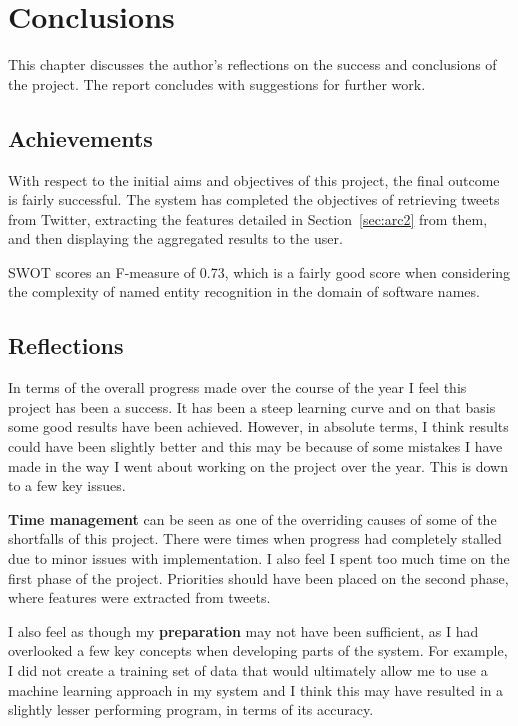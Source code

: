 \chapter{Conclusions}
\label{cha:conclusion}
This chapter discusses the author's reflections on the success and conclusions of the project. The report concludes with suggestions for further work.

\section{Achievements}
With respect to the initial aims and objectives of this project, the final outcome is fairly successful. The system has completed the objectives of retrieving tweets from Twitter, extracting the features detailed in Section~\ref{sec:arc2} from them, and then displaying the aggregated results to the user.

SWOT scores an F-measure of 0.73, which is a fairly good score when considering the complexity of named entity recognition in the domain of software names.

\section{Reflections}
In terms of the overall progress made over the course of the year I feel this project has been a success. It has been a steep learning curve and on that basis some good results have been achieved. However, in absolute terms, I think results could have been slightly better and this may be because of some mistakes I have made in the way I went about working on the project over the year. This is down to a few key issues.

\textbf{Time management} can be seen as one of the overriding causes of some of the shortfalls of this project. There were times when progress had completely stalled due to minor issues with implementation. I also feel I spent too much time on the first phase of the project. Priorities should have been placed on the second phase, where features were extracted from tweets.

I also feel as though my \textbf{preparation} may not have been sufficient, as I had overlooked a few key concepts when developing parts of the system. For example, I did not create a training set of data that would ultimately allow me to use a machine learning approach in my system and I think this may have resulted in a slightly lesser performing program, in terms of its accuracy.

